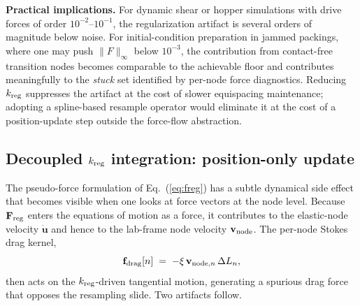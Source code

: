 \documentclass[aps,pre,twocolumn,floatfix,longbibliography]{revtex4-2}
\begin{document}
\textbf{Practical implications.}
For dynamic shear or hopper simulations with drive forces of order
$10^{-2}$--$10^{-1}$, the regularization artifact is several orders of
magnitude below noise. For initial-condition preparation in jammed
packings, where one may push $\|F\|_\infty$ below $10^{-3}$, the
contribution from contact-free transition nodes becomes comparable to
the achievable floor and contributes meaningfully to the \emph{stuck}
set identified by per-node force diagnostics. Reducing $k_{\rm reg}$
suppresses the artifact at the cost of slower equispacing maintenance;
adopting a spline-based resample operator would eliminate it at the
cost of a position-update step outside the force-flow abstraction.

\subsection{Decoupled $k_{\rm reg}$ integration: position-only update}
\label{sec:kreg_decouple}

The pseudo-force formulation of Eq.~(\ref{eq:freg}) has a subtle dynamical
side effect that becomes visible when one looks at force vectors at the
node level. Because $\mathbf{F}_{\rm reg}$ enters the equations of motion
as a force, it contributes to the elastic-node velocity $\dot{\mathbf{u}}$
and hence to the lab-frame node velocity $\mathbf{v}_{\rm node}$. The
per-node Stokes drag kernel,
\begin{equation}
  \mathbf{f}_{\rm drag}[n] \;=\; -\xi\, \mathbf{v}_{{\rm node},n}\,\Delta L_n,
\label{eq:fdrag_kreg}
\end{equation}
then acts on the $k_{\rm reg}$-driven tangential motion, generating a
spurious drag force that opposes the resampling slide. Two artifacts
follow.
\end{document}
